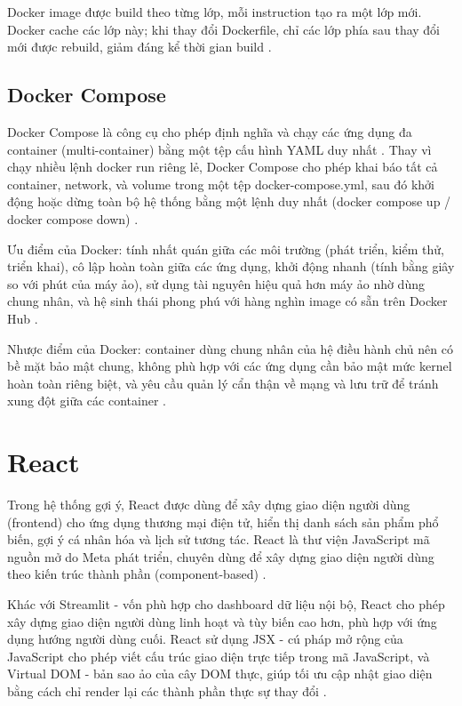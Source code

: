 \documentclass[../BTL.tex]{subfiles}
\begin{document}
Docker image được build theo từng lớp, mỗi instruction tạo ra một lớp mới. Docker cache các lớp này; khi thay đổi Dockerfile, chỉ các lớp phía sau thay đổi mới được rebuild, giảm đáng kể thời gian build \cite{docker_official}.

\subsection{Docker Compose}
Docker Compose là công cụ cho phép định nghĩa và chạy các ứng dụng đa container (multi-container) bằng một tệp cấu hình YAML duy nhất \cite{docker_official,docker_primer}. Thay vì chạy nhiều lệnh docker run riêng lẻ, Docker Compose cho phép khai báo tất cả container, network, và volume trong một tệp docker-compose.yml, sau đó khởi động hoặc dừng toàn bộ hệ thống bằng một lệnh duy nhất (docker compose up / docker compose down) \cite{docker_official}.

Ưu điểm của Docker: tính nhất quán giữa các môi trường (phát triển, kiểm thử, triển khai), cô lập hoàn toàn giữa các ứng dụng, khởi động nhanh (tính bằng giây so với phút của máy ảo), sử dụng tài nguyên hiệu quả hơn máy ảo nhờ dùng chung nhân, và hệ sinh thái phong phú với hàng nghìn image có sẵn trên Docker Hub \cite{docker_official,docker_primer}.

Nhược điểm của Docker: container dùng chung nhân của hệ điều hành chủ nên có bề mặt bảo mật chung, không phù hợp với các ứng dụng cần bảo mật mức kernel hoàn toàn riêng biệt, và yêu cầu quản lý cẩn thận về mạng và lưu trữ để tránh xung đột giữa các container \cite{docker_wikipedia}.


\section{React}
Trong hệ thống gợi ý, React được dùng để xây dựng giao diện người dùng (frontend) cho ứng dụng thương mại điện tử, hiển thị danh sách sản phẩm phổ biến, gợi ý cá nhân hóa và lịch sử tương tác. React là thư viện JavaScript mã nguồn mở do Meta phát triển, chuyên dùng để xây dựng giao diện người dùng theo kiến trúc thành phần (component-based) \cite{react_official}.

Khác với Streamlit - vốn phù hợp cho dashboard dữ liệu nội bộ, React cho phép xây dựng giao diện người dùng linh hoạt và tùy biến cao hơn, phù hợp với ứng dụng hướng người dùng cuối. React sử dụng JSX - cú pháp mở rộng của JavaScript cho phép viết cấu trúc giao diện trực tiếp trong mã JavaScript, và Virtual DOM - bản sao ảo của cây DOM thực, giúp tối ưu cập nhật giao diện bằng cách chỉ render lại các thành phần thực sự thay đổi \cite{react_official}.
\end{document}
